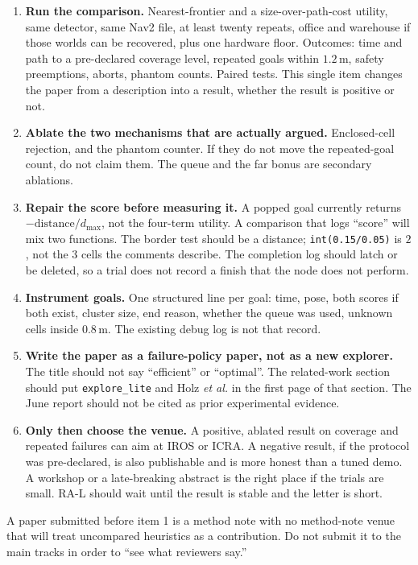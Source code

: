 \documentclass[11pt]{article}
\begin{document}
\begin{enumerate}
\item \textbf{Run the comparison.} Nearest-frontier and a size-over-path-cost utility, same detector, same Nav2 file, at least twenty repeats, office and warehouse if those worlds can be recovered, plus one hardware floor. Outcomes: time and path to a pre-declared coverage level, repeated goals within $1.2$\,m, safety preemptions, aborts, phantom counts. Paired tests. This single item changes the paper from a description into a result, whether the result is positive or not.
\item \textbf{Ablate the two mechanisms that are actually argued.} Enclosed-cell rejection, and the phantom counter. If they do not move the repeated-goal count, do not claim them. The queue and the far bonus are secondary ablations.
\item \textbf{Repair the score before measuring it.} A popped goal currently returns $-\mathrm{distance}/d_{\max}$, not the four-term utility. A comparison that logs ``score'' will mix two functions. The border test should be a distance; \texttt{int(0.15/0.05)} is $2$, not the $3$ cells the comments describe. The completion log should latch or be deleted, so a trial does not record a finish that the node does not perform.
\item \textbf{Instrument goals.} One structured line per goal: time, pose, both scores if both exist, cluster size, end reason, whether the queue was used, unknown cells inside $0.8$\,m. The existing debug log is not that record.
\item \textbf{Write the paper as a failure-policy paper, not as a new explorer.} The title should not say ``efficient'' or ``optimal''. The related-work section should put \texttt{explore\_lite} and Holz \emph{et al.} in the first page of that section. The June report should not be cited as prior experimental evidence.
\item \textbf{Only then choose the venue.} A positive, ablated result on coverage and repeated failures can aim at IROS or ICRA. A negative result, if the protocol was pre-declared, is also publishable and is more honest than a tuned demo. A workshop or a late-breaking abstract is the right place if the trials are small. RA-L should wait until the result is stable and the letter is short.
\end{enumerate}

A paper submitted before item 1 is a method note with no method-note venue that will treat uncompared heuristics as a contribution. Do not submit it to the main tracks in order to ``see what reviewers say.''
\end{document}
